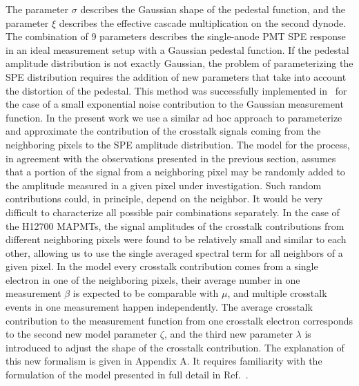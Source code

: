 The parameter ${\sigma}$ describes the Gaussian shape of the pedestal function, and the parameter ${\xi}$  describes the effective cascade multiplication on the second dynode. The combination of 9 parameters describes the single-anode PMT SPE response in an ideal measurement setup with a Gaussian pedestal function. If the pedestal amplitude distribution is not exactly Gaussian, the problem of parameterizing the SPE distribution requires the addition of new parameters that take into account the distortion of the pedestal. This method was successfully implemented in~\cite{DEGTIARENKO20171} for the case of a small exponential noise contribution to the Gaussian measurement function. In the present work we use a similar ad hoc approach to parameterize and approximate the contribution of the crosstalk signals coming from the neighboring pixels to the SPE amplitude distribution. The model for the process, in agreement with the observations presented in the previous section, assumes that a portion of the signal from a neighboring pixel may be randomly added to the amplitude measured in a given pixel under investigation. Such random contributions could, in principle, depend on the neighbor. It would be very difficult to characterize all possible pair combinations separately. In the case of the H12700 MAPMTs, the signal amplitudes of the crosstalk contributions from different neighboring pixels were found to be relatively small and similar to each other, allowing us to use the single averaged spectral term for all neighbors of a given pixel. In the model every crosstalk contribution comes from a single electron in one of the neighboring pixels, their average number in one measurement $\beta$ is expected to be comparable with $\mu$, and multiple crosstalk events in one measurement happen independently. The average crosstalk contribution to the measurement function from one crosstalk electron corresponds to the second new model parameter $\zeta$, and the third new parameter $\lambda$ is introduced to adjust the shape of the crosstalk contribution. The explanation of this new formalism is given in Appendix A. It requires familiarity with the formulation of the model presented in full detail in Ref.~\cite{DEGTIARENKO20171}.

